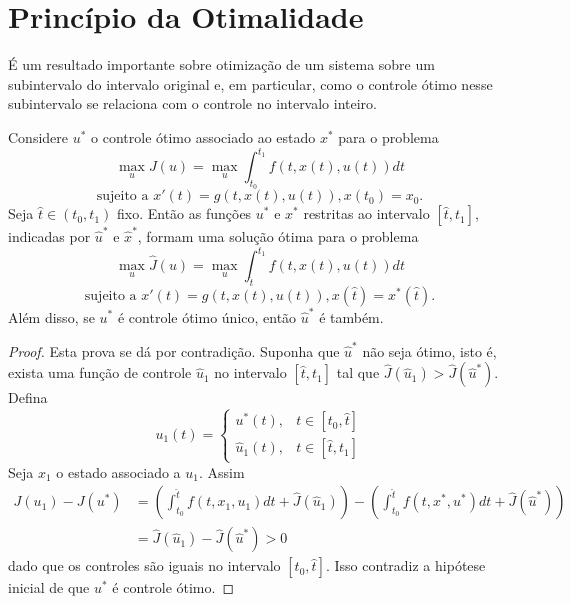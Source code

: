\section{Princípio da Otimalidade}

É um resultado importante sobre otimização de um sistema sobre um subintervalo do
intervalo original e, em particular, como o controle ótimo nesse subintervalo
se relaciona com o controle no intervalo inteiro. 

\begin{theorem}
    Considere $u^*$ o controle ótimo associado ao estado $x^*$ para o problema
    $$
    \max_u J(u) = \max_u \int_{t_0}^{t_1} f(t, x(t), u(t)) dt 
    $$
    $$
    \text{sujeito a  }x'(t) = g(t, x(t), u(t)), x(t_0) = x_0.
    $$
    Seja $\hat{t} \in (t_0, t_1)$ fixo. Então as
    funções $u^*$ e $x^*$ restritas ao intervalo $[\hat{t},t_1]$, indicadas
    por $\hat{u}^*$ e $\hat{x}^*$, formam uma solução ótima para o problema 
    $$
    \max_u \hat{J}(u) = \max_u \int_{\hat{t}}^{t_1} f(t, x(t), u(t)) dt 
    $$
    $$
    \text{sujeito a  }x'(t) = g(t, x(t), u(t)), x(\hat{t}) = x^*(\hat{t}).
    $$
    Além disso, se $u^*$ é controle ótimo único, então
    $\hat{u}^*$ é também. 
\end{theorem}

\begin{proof}
    Esta prova se dá por contradição. Suponha que $\hat{u}^*$ não seja ótimo,
    isto é, exista uma função de controle $\hat{u}_1$ no intervalo $[\hat{t},
    t_1]$ tal que $\hat{J}(\hat{u}_1) > \hat{J}(\hat{u}^*)$. Defina 
    $$u_1(t) = 
    \begin{cases}
        u^*(t), &t \in [t_0, \hat{t}] \\
        \hat{u}_1(t), &t \in [\hat{t}, t_1]
    \end{cases}
    $$
    Seja $x_1$ o estado associado a $u_1$. Assim 
    \begin{equation*}
        \begin{split}
            J(u_1) - J(u^*) &= \left(\int_{t_0}^{\hat{t}} f(t,x_1,u_1)dt +
            \hat{J}(\hat{u}_1)\right) - \left(\int_{t_0}^{\hat{t}} f(t,x^*,u^*)dt +
            \hat{J}(\hat{u}^*)\right) \\
            &= \hat{J}(\hat{u}_1) - \hat{J}(\hat{u}^*) > 0 
        \end{split}        
    \end{equation*}
    dado que os controles são iguais no intervalo $[t_0, \hat{t}]$. Isso contradiz a hipótese inicial de que $u^*$ é controle ótimo. 
\end{proof}

